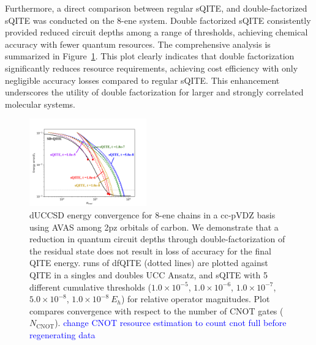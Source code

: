\documentclass[aip,jcp,amsmath,amssymb, reprint]{revtex4-1}
\begin{document}

Furthermore, a direct comparison between regular sQITE, and double-factorized sQITE was conducted on the 8-ene system. Double factorized sQITE consistently provided reduced circuit depths among a range of thresholds, achieving chemical accuracy with fewer quantum resources. The comprehensive analysis is summarized in Figure~\ref{fig:df_plot_ene}. This plot clearly indicates that double factorization significantly reduces resource requirements, achieving cost efficiency with only negligible accuracy losses compared to regular sQITE. This enhancement underscores the utility of double factorization for larger and strongly correlated molecular systems.
\begin{figure}[h!]
\centering
\includegraphics[width=0.45\textwidth]{sqite_paper/paper_df_ham_plot.png}
\caption{dUCCSD energy convergence for 8-ene chains in a cc-pVDZ basis using AVAS among 2pz orbitals of carbon. We demonstrate that a reduction in quantum circuit depths through double-factorization of the residual state does not result in loss of accuracy for the final QITE energy. runs of dfQITE (dotted lines) are plotted against QITE in a singles and doubles UCC Ansatz, and sQITE with 5 different cumulative thresholds ($1.0 \times 10^{-5}$, $1.0 \times 10^{-6}$, $1.0 \times 10^{-7}$, $5.0 \times 10^{-8}$, $1.0 \times 10^{-8}\ E_h$) for relative operator magnitudes. Plot compares convergence with respect to the number of CNOT gates ($N_\mathrm{CNOT}$). \textcolor{blue}{change CNOT resource estimation to count cnot full before regenerating data}}
\label{fig:df_plot_ene}
\end{figure}
\end{document}
